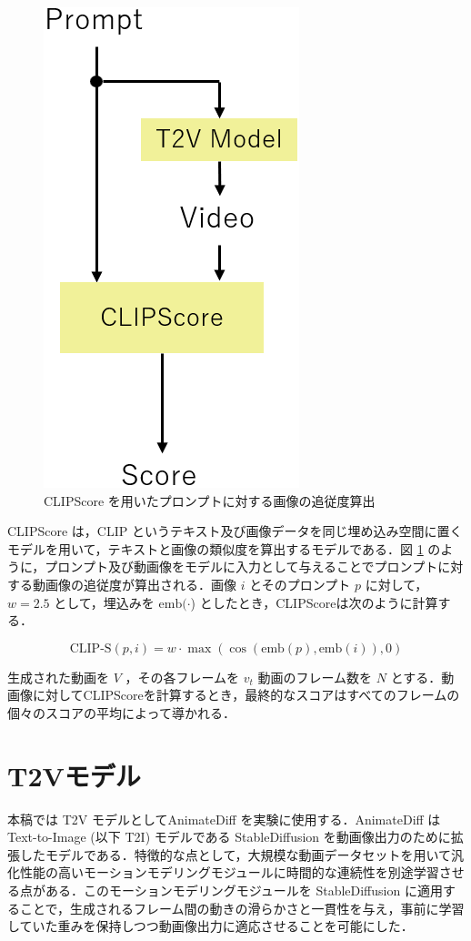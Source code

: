 \documentclass[11pt,a4j]{jreport}
\begin{document}
\begin{figure}[t]
    \centering
    \includegraphics[width=0.3\linewidth]{CLIPScore.png}
    \caption{CLIPScore を用いたプロンプトに対する画像の追従度算出}
    \label{fig:CLIPScore}
\end{figure}

CLIPScore \cite{hessel2021clipscore} は，CLIP \cite{radford2021clip} というテキスト及び画像データを同じ埋め込み空間に置くモデルを用いて，テキストと画像の類似度を算出するモデルである．図 \ref{fig:CLIPScore} のように，プロンプト及び動画像をモデルに入力として与えることでプロンプトに対する動画像の追従度が算出される．画像 $i$ とそのプロンプト $p$ に対して，$w=2.5$ として，埋込みを $\text{emb}(\cdot$) としたとき，CLIPScoreは次のように計算する．

\begin{equation}\text{CLIP-S}(p,i)=w\cdot\max(\cos(\text{emb}(p),\text{emb}(i)),0)\end{equation}
\label{eq:CLIPScore}

生成された動画を $V$ ，その各フレームを $v_t$ 動画のフレーム数を $N$ とする．動画像に対してCLIPScoreを計算するとき，最終的なスコアはすべてのフレームの個々のスコアの平均によって導かれる．

\section{T2Vモデル}
\label{sec:t2v}

本稿では T2V モデルとしてAnimateDiff \cite{guo2023animatediff} を実験に使用する．AnimateDiff は Text-to-Image (以下 T2I) モデルである StableDiffusion \cite{rombach2022high} を動画像出力のために拡張したモデルである．特徴的な点として，大規模な動画データセットを用いて汎化性能の高いモーションモデリングモジュールに時間的な連続性を別途学習させる点がある．このモーションモデリングモジュールを StableDiffusion に適用することで，生成されるフレーム間の動きの滑らかさと一貫性を与え，事前に学習していた重みを保持しつつ動画像出力に適応させることを可能にした．
\end{document}
